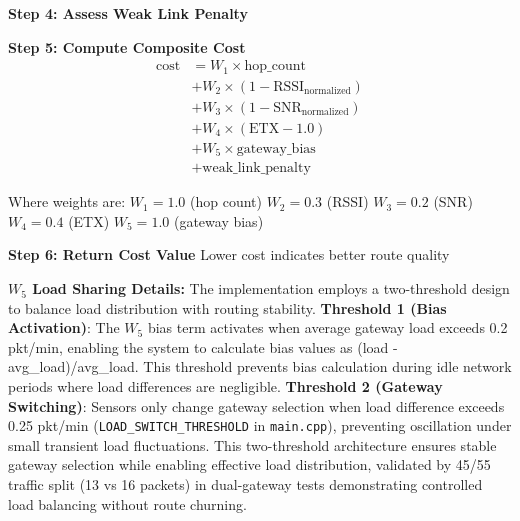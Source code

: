 \begin{algorithm}[H]
\caption{Multi-Metric Cost Calculation (Part 2: Cost Computation)}
\label{alg:cost-part2}
\label{alg:cost}
\SetAlgoLined
\DontPrintSemicolon

\textbf{Step 4: Assess Weak Link Penalty}\;
\Indp
{}
\Indm

\textbf{Step 5: Compute Composite Cost}\;
\Indp
\begin{align*}
\text{cost} &= W_1 \times \text{hop\_count} \\
            &+ W_2 \times (1 - \text{RSSI}_{\text{normalized}}) \\
            &+ W_3 \times (1 - \text{SNR}_{\text{normalized}}) \\
            &+ W_4 \times (\text{ETX} - 1.0) \\
            &+ W_5 \times \text{gateway\_bias} \\
            &+ \text{weak\_link\_penalty}
\end{align*}

Where weights are:\;
\Indp
$W_1 = 1.0$ (hop count)\;
$W_2 = 0.3$ (RSSI)\;
$W_3 = 0.2$ (SNR)\;
$W_4 = 0.4$ (ETX)\;
$W_5 = 1.0$ (gateway bias)\;
\Indm
\Indm

\textbf{Step 6: Return Cost Value}\;
\Indp
Lower cost indicates better route quality\;
\Indm
\end{algorithm}

\textbf{$W_5$ Load Sharing Details:} The implementation employs a two-threshold design to balance load distribution with routing stability. \textbf{Threshold 1 (Bias Activation)}: The $W_5$ bias term activates when average gateway load exceeds 0.2 pkt/min, enabling the system to calculate bias values as (load - avg\_load)/avg\_load. This threshold prevents bias calculation during idle network periods where load differences are negligible. \textbf{Threshold 2 (Gateway Switching)}: Sensors only change gateway selection when load difference exceeds 0.25 pkt/min (\texttt{LOAD\_SWITCH\_THRESHOLD} in \texttt{main.cpp}), preventing oscillation under small transient load fluctuations. This two-threshold architecture ensures stable gateway selection while enabling effective load distribution, validated by 45/55 traffic split (13 vs 16 packets) in dual-gateway tests demonstrating controlled load balancing without route churning.

